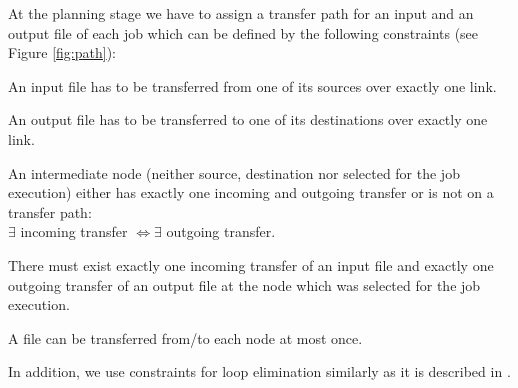\documentclass[english]{ddny}
\begin{document}
At the planning stage we have to assign a transfer path for an input and an output file of each job which can be defined by the following constraints (see Figure \ref{fig:path}):
\begin{description}
\label{path}
		\item[1.] An input file has to be transferred from one of its sources over exactly one link.
		\item[2.] An output file has to be transferred to one of its destinations over exactly one link.
		\item[3.] An intermediate node (neither source, destination nor selected for the job execution) either has exactly one incoming and outgoing transfer or is not on a transfer path:\\ $\exists$ incoming transfer $\Leftrightarrow \exists$ outgoing transfer. 
		\item[4.] There must exist exactly one incoming transfer of an input file and exactly one outgoing transfer of an output file at the node which was selected for the job execution.	
		\item[5.] A file can be transferred from/to each node at most once.		
\end{description}
In addition, we use constraints for loop elimination similarly as it is described in \cite{Rudova}.
\end{document}

